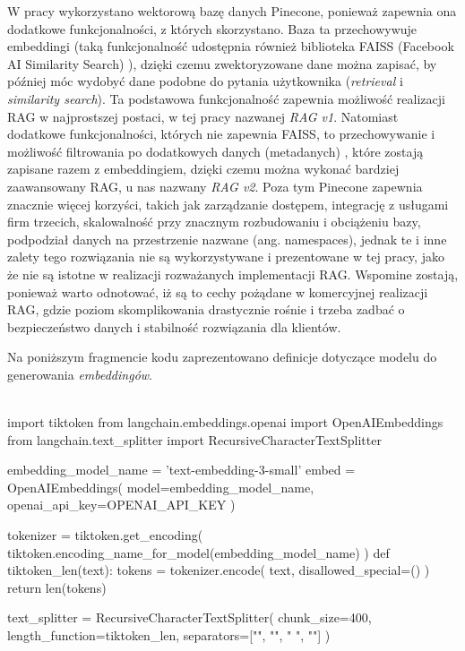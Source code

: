 \documentclass[
a4paper,
12pt,
]{article}
\newcounter{subsubsubsection}[subsubsection]
\begin{document}
W pracy wykorzystano wektorową bazę danych Pinecone, ponieważ zapewnia ona dodatkowe funkcjonalności, z których skorzystano. Baza ta przechowywuje embeddingi (taką funkcjonalność udostępnia również biblioteka FAISS (Facebook AI Similarity Search) \cite{faiss}), dzięki czemu zwektoryzowane dane można zapisać, by później móc wydobyć dane podobne do pytania użytkownika (\textit{retrieval} i \textit{similarity search}). Ta podstawowa funkcjonalność zapewnia możliwość realizacji RAG w najprostszej postaci, w tej pracy nazwanej \textit{RAG v1}. Natomiast dodatkowe funkcjonalności, których nie zapewnia FAISS, to przechowywanie i możliwość filtrowania po dodatkowych danych (metadanych) \cite{pinecone:metatdata}, które zostają zapisane razem z embeddingiem, dzięki czemu można wykonać bardziej zaawansowany RAG, u nas nazwany \textit{RAG v2}. Poza tym Pinecone zapewnia znacznie więcej korzyści, takich jak zarządzanie dostępem, integrację z usługami firm trzecich, skalowalność przy znacznym rozbudowaniu i obciążeniu bazy, podpodział danych na przestrzenie nazwane (ang. namespaces), jednak te i inne zalety tego rozwiązania nie są wykorzystywane i prezentowane w tej pracy, jako że nie są istotne w realizacji rozważanych implementacji RAG. Wspomine zostają, ponieważ warto odnotować, iż są to cechy pożądane w komercyjnej realizacji RAG, gdzie poziom skomplikowania drastycznie rośnie i trzeba zadbać o bezpieczeństwo danych i stabilność rozwiązania dla klientów.


Na poniższym fragmencie kodu zaprezentowano definicje dotyczące modelu do generowania \textit{embeddingów}.

\begin{python}\\
import tiktoken
from langchain.embeddings.openai import OpenAIEmbeddings
from langchain.text_splitter import RecursiveCharacterTextSplitter

embedding_model_name = 'text-embedding-3-small'
embed = OpenAIEmbeddings(
    model=embedding_model_name,
    openai_api_key=OPENAI_API_KEY
)

tokenizer = tiktoken.get_encoding(
    tiktoken.encoding_name_for_model(embedding_model_name)
)
def tiktoken_len(text):
    tokens = tokenizer.encode(
        text,
        disallowed_special=()
    )
    return len(tokens)

text_splitter = RecursiveCharacterTextSplitter(
    chunk_size=400,
    length_function=tiktoken_len,
    separators=["\n\n", "\n", " ", ""]
)
\end{python}
\end{document}
